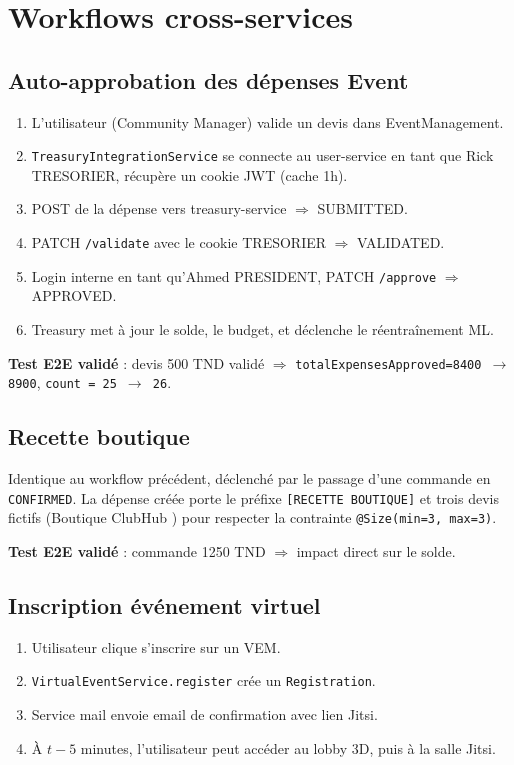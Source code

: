 \documentclass[11pt,a4paper]{report}
\begin{document}
\chapter{Workflows cross-services}

\section{Auto-approbation des dépenses Event}

\begin{enumerate}
  \item L'utilisateur (Community Manager) valide un devis dans EventManagement.
  \item \texttt{TreasuryIntegrationService} se connecte au user-service en tant
        que Rick TRESORIER, récupère un cookie JWT (cache 1h).
  \item POST de la dépense vers treasury-service \(\Rightarrow\) SUBMITTED.
  \item PATCH \texttt{/validate} avec le cookie TRESORIER \(\Rightarrow\) VALIDATED.
  \item Login interne en tant qu'Ahmed PRESIDENT, PATCH \texttt{/approve}
        \(\Rightarrow\) APPROVED.
  \item Treasury met à jour le solde, le budget, et déclenche le réentraînement
        ML.
\end{enumerate}

\textbf{Test E2E validé} : devis 500 TND validé \(\Rightarrow\)
\texttt{totalExpensesApproved=8400 \(\rightarrow\) 8900}, \texttt{count = 25
\(\rightarrow\) 26}.

\section{Recette boutique}

Identique au workflow précédent, déclenché par le passage d'une commande en
\texttt{CONFIRMED}. La dépense créée porte le préfixe \texttt{[RECETTE BOUTIQUE]}
et trois devis fictifs (\og Boutique ClubHub \fg) pour respecter la contrainte
\texttt{@Size(min=3, max=3)}.

\textbf{Test E2E validé} : commande 1250 TND \(\Rightarrow\) impact direct sur
le solde.

\section{Inscription événement virtuel}

\begin{enumerate}
  \item Utilisateur clique \og s'inscrire \fg sur un VEM.
  \item \texttt{VirtualEventService.register} crée un \texttt{Registration}.
  \item Service mail envoie email de confirmation avec lien Jitsi.
  \item À \(t-5\) minutes, l'utilisateur peut accéder au lobby 3D, puis à la
        salle Jitsi.
\end{enumerate}
\end{document}
